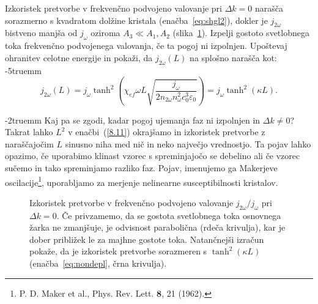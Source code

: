 \begin{naloga}
\label{deplet}
Izkoristek pretvorbe v frekvenčno podvojeno valovanje 
pri $\Delta k = 0$  narašča sorazmerno s kvadratom 
dolžine kristala (enačba~\ref{eq:shgl2}), dokler je 
$j_{2\omega}$ bistveno manjša od $j_{\omega}$ oziroma $A_3 \ll A_1, A_2$ (slika~\ref{fig:shg2dep}). 
Izpelji gostoto svetlobnega toka frekvenčno podvojenega valovanja, če ta pogoj ni izpolnjen. 
Upoštevaj ohranitev celotne energije in pokaži, da $j_{2\omega}(L)$ na splošno narašča kot:
\vglue-5truemm
\begin{equation}
j_{2\omega} (L) = j_\omega \tanh^2 \left(\chi_{ef}\omega L \sqrt{\frac{j_\omega}
{2 n_{2\omega} n_\omega^2 c_0^3 \varepsilon_0}} \right) = j_\omega \tanh^2(\kappa L).
\label{eq:nondepl}
\end{equation}
\end{naloga}
\vglue-2truemm
Kaj pa se zgodi, kadar pogoj ujemanja faz ni izpolnjen in 
 $\Delta k \neq 0$? Takrat lahko  $L^2$ v enačbi~(\ref{8.11})
okrajšamo in izkoristek pretvorbe z naraščajočim
$L$ sinusno niha med nič in neko največjo vrednostjo. Ta pojav lahko opazimo, če
uporabimo klinast vzorec s spreminjajočo se debelino ali če vzorec sučemo 
in tako spreminjamo razliko faz. Pojav, imenujemo ga Makerjeve 
oscilacije\footnote{P. D. Maker et al., Phys. Rev. Lett. $\mathbf{8}$, 21 (1962).}, 
uporabljamo za merjenje nelinearne susceptibilnosti kristalov.
\begin{figure}[ht]
\centering
\def\svgwidth{72truemm} 

\caption{Izkoristek pretvorbe v frekvenčno podvojeno valovanje $j_{2\omega}/j_\omega$ 
pri $\Delta k = 0$.
Če privzamemo, da se gostota svetlobnega toka osnovnega žarka ne zmanjšuje, 
je odvisnost parabolična (rdeča krivulja), kar 
je dober približek le za majhne gostote toka. Natančnejši izračun pokaže, da je izkoristek 
pretvorbe sorazmeren s $\tanh^2(\kappa L)$ (enačba~\ref{eq:nondepl}, črna krivulja).}
\label{fig:shg2dep}
\end{figure}


